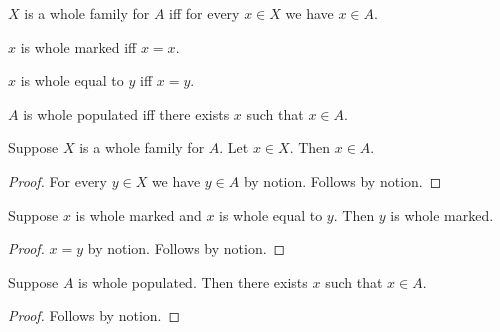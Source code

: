 \begin{definition}\label{whole_family}
    $X$ is a whole family for $A$ iff
    for every $x\in X$ we have $x\in A$.
\end{definition}

\begin{definition}\label{whole_marked}
    $x$ is whole marked iff $x=x$.
\end{definition}

\begin{definition}\label{whole_equal}
    $x$ is whole equal to $y$ iff $x=y$.
\end{definition}

\begin{abbreviation}\label{whole_populated}
    $A$ is whole populated iff there exists $x$ such that $x\in A$.
\end{abbreviation}

\begin{proposition}\label{whole_universal_becomes_supplied}
    Suppose $X$ is a whole family for $A$.
    Let $x\in X$.
    Then $x\in A$.
\end{proposition}
\begin{proof}
    For every $y\in X$ we have $y\in A$ by notion.
    Follows by notion.
\end{proof}

\begin{proposition}\label{whole_equality_becomes_supplied}
    Suppose $x$ is whole marked and $x$ is whole equal to $y$.
    Then $y$ is whole marked.
\end{proposition}
\begin{proof}
    $x=y$ by notion.
    Follows by notion.
\end{proof}

\begin{proposition}\label{whole_existential_exact}
    Suppose $A$ is whole populated.
    Then there exists $x$ such that $x\in A$.
\end{proposition}
\begin{proof}
    Follows by notion.
\end{proof}
